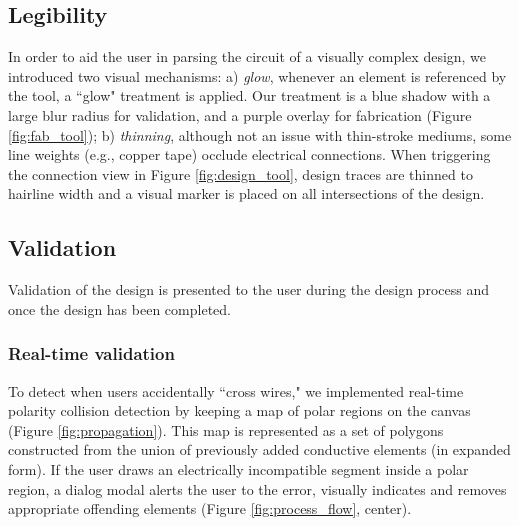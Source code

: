 \documentclass{sigchi}
\begin{document}
    \subsection{Legibility}
        In order to aid the user in parsing the circuit of a visually complex design, we introduced two visual mechanisms: a) \textit{glow}, whenever an element is referenced by the tool, a ``glow" treatment is applied. Our treatment is a blue shadow with a large blur radius for validation, and a purple overlay for fabrication (Figure \ref{fig:fab_tool}); b) \textit{thinning}, although not an issue with thin-stroke mediums, some line weights (e.g., copper tape) occlude electrical connections. When triggering the connection view in Figure \ref{fig:design_tool}, design traces are thinned to hairline width and a visual marker is placed on all intersections of the design.
        
\subsection{Validation}
    Validation of the design is presented to the user during the design process and once the design has been completed. %
    \subsubsection{Real-time validation}
        To detect when users accidentally ``cross wires," we implemented real-time polarity collision detection by keeping a map of polar regions on the canvas (Figure \ref{fig:propagation}). This map is represented as a set of polygons constructed from the union of previously added conductive elements (in expanded form).
        If the user draws an electrically incompatible segment inside a polar region, a dialog modal alerts the user to the error, visually indicates and removes appropriate offending elements (Figure \ref{fig:process_flow}, center).
\end{document}
